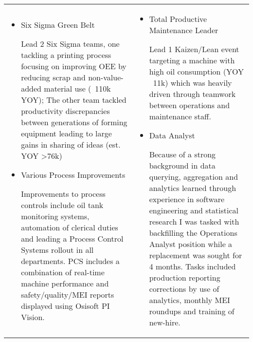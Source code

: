 \documentclass[a4paper, oneside, final, 10pt]{scrartcl} %
\begin{document}
\begin{center}
\vspace{-10pt}
\begin{tabularx}{0.97\linewidth}{X|X}
    \vspace{-10pt}
    \begin{itemize}\setlength\itemsep{0em}
        \item{Six Sigma Green Belt}
        \begin{sloppypar}
            Lead 2 Six Sigma teams, one tackling a printing process focusing on improving OEE by reducing scrap and non-value-added material use (~110k YOY); The other team tackled productivity discrepancies between generations of forming equipment leading to large gains in sharing of ideas (est. YOY >76k)
        \end{sloppypar}
        \item{Various Process Improvements}
        \begin{sloppypar}
            Improvements to process controls include oil tank monitoring systems, automation of clerical duties and leading a Process Control Systems rollout in all departments. PCS includes a combination of real-time machine performance and safety/quality/MEI reports displayed using Osisoft PI Vision.
        \end{sloppypar}
    \end{itemize} & \vspace{-10pt} \begin{itemize}\setlength\itemsep{0em}
        \item{Total Productive Maintenance Leader}
        \begin{sloppypar}
            Lead 1 Kaizen/Lean event targeting a machine with high oil consumption (YOY ~11k) which was heavily driven through teamwork between operations and maintenance staff.
        \end{sloppypar}
        \item{Data Analyst}
        \begin{sloppypar}
            Because of a strong background in data querying, aggregation and analytics learned through experience in software engineering and statistical research I was tasked with backfilling the Operations Analyst position while a replacement was sought for 4 months. Tasks included production reporting corrections by use of analytics, monthly MEI roundups and training of new-hire. 
        \end{sloppypar}
    \end{itemize}
\end{tabularx}


\end{center}
\end{document}
